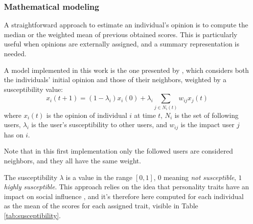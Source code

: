 \subsubsection{Mathematical modeling}
A straightforward approach to estimate an individual's opinion is to compute the median or the weighted mean of previous obtained scores.
This is particularly useful when opinions are externally assigned, and a summary representation is needed.

\medskip
A model implemented in this work is the one presented by \citet{friedkin_1990}, which considers both the individuals' initial opinion and those of their neighbors, weighted by a susceptibility value:
\[
x_i(t + 1) = (1 - \lambda_i) x_i(0) + \lambda_i   \sum_{j \in N_i(t)} w_{ij} x_j(t)
\]
where $x_i(t)$ is the opinion of individual $i$ at time $t$, $N_i$ is the set of following users, $\lambda_i$ is the user's susceptibility to other users, and $w_{ij}$ is the impact user $j$ has on $i$. 

Note that in this first implementation only the followed users are considered neighbors, and they all have the same weight.

The susceptibility $\lambda$ is a value in the range $[0,1]$, $0$ meaning \textit{not susceptible}, $1$ \textit{highly susceptible}.
This approach relies on the idea that personality traits have an impact on social influence \cite{oyibo2019personality}, and it's therefore here computed for each individual as the mean of the scores for each assigned trait, visible in Table \ref{tab:susceptibility}.

